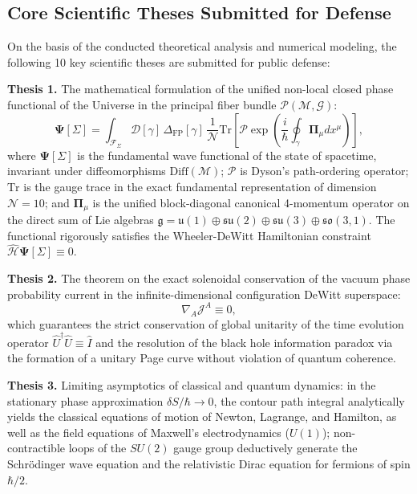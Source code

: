 \documentclass[11pt,a4paper]{article}
\theoremstyle{definition}
\begin{document}
\subsection{Core Scientific Theses Submitted for Defense}\label{subsec:theses}

On the basis of the conducted theoretical analysis and numerical modeling, the following 10 key scientific theses are submitted for public defense:

\textbf{Thesis 1.} The mathematical formulation of the unified non-local closed phase functional of the Universe in the principal fiber bundle $\mathcal{P}(\mathcal{M}, \mathcal{G})$:
\begin{equation}\label{eq:0.4}\tag{0.4}
\mathbf{\Psi}[\Sigma] = \int_{\mathcal{F}_\Sigma} \mathcal{D}[\gamma] \, \Delta_{\text{FP}}[\gamma] \, \frac{1}{\mathcal{N}} \text{Tr}\left[ \mathcal{P}\exp\left( \frac{i}{\hbar} \oint_\gamma \mathbf{\Pi}_\mu dx^\mu \right) \right],
\end{equation}
where $\mathbf{\Psi}[\Sigma]$ is the fundamental wave functional of the state of spacetime, invariant under diffeomorphisms $\text{Diff}(\mathcal{M})$; $\mathcal{P}$ is Dyson's path-ordering operator; $\text{Tr}$ is the gauge trace in the exact fundamental representation of dimension $\mathcal{N} = 10$; and $\mathbf{\Pi}_\mu$ is the unified block-diagonal canonical 4-momentum operator on the direct sum of Lie algebras $\mathfrak{g} = \mathfrak{u}(1) \oplus \mathfrak{su}(2) \oplus \mathfrak{su}(3) \oplus \mathfrak{so}(3,1)$. The functional rigorously satisfies the Wheeler-DeWitt Hamiltonian constraint $\hat{\mathcal{H}} \mathbf{\Psi}[\Sigma] \equiv 0$.

\textbf{Thesis 2.} The theorem on the exact solenoidal conservation of the vacuum phase probability current in the infinite-dimensional configuration DeWitt superspace:
\begin{equation}\label{eq:0.5}\tag{0.5}
\nabla_A \mathcal{J}^A \equiv 0,
\end{equation}
which guarantees the strict conservation of global unitarity of the time evolution operator $\hat{U}^\dagger \hat{U} \equiv \hat{I}$ and the resolution of the black hole information paradox via the formation of a unitary Page curve without violation of quantum coherence.

\textbf{Thesis 3.} Limiting asymptotics of classical and quantum dynamics: in the stationary phase approximation $\delta S / \hbar \to 0$, the contour path integral analytically yields the classical equations of motion of Newton, Lagrange, and Hamilton, as well as the field equations of Maxwell's electrodynamics ($U(1)$); non-contractible loops of the $SU(2)$ gauge group deductively generate the Schrödinger wave equation and the relativistic Dirac equation for fermions of spin $\hbar/2$.
\end{document}
